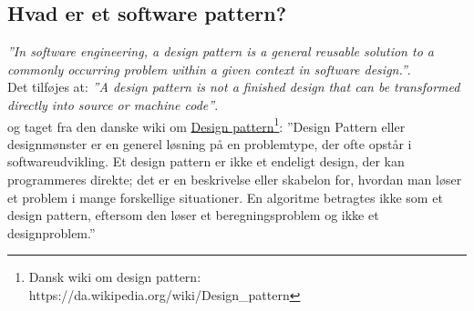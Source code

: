 \subsection{Hvad er et software pattern?}
\textit{''In software engineering, a design pattern is a general reusable solution to a commonly occurring problem within a given context in software design.''}.\\

Det tilføjes at: 
\textit{''A design pattern is not a finished design that can be transformed directly into source or machine code''}.\\

og taget fra den danske wiki om \href{https://da.wikipedia.org/wiki/Design_pattern}{Design pattern\footnote{Dansk wiki om design pattern:  \url{https://da.wikipedia.org/wiki/Design_pattern}}}:
''Design Pattern eller designmønster er en generel løsning på en problemtype, der ofte opstår i softwareudvikling. Et design pattern er ikke et endeligt design, der kan programmeres direkte; det er en beskrivelse eller skabelon for, hvordan man løser et problem i mange forskellige situationer. En algoritme betragtes ikke som et design pattern, eftersom den løser et beregningsproblem og ikke et designproblem.''
